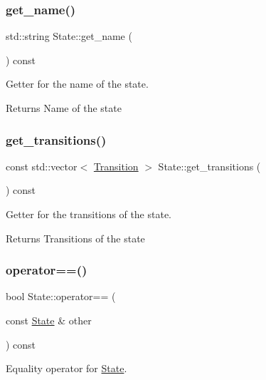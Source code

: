 \subsubsection{\texorpdfstring{get\+\_\+name()}{get\_name()}}
{\footnotesize\ttfamily std\+::string State\+::get\+\_\+name (\begin{DoxyParamCaption}{ }\end{DoxyParamCaption}) const}



Getter for the name of the state. 

\begin{DoxyReturn}{Returns}
Name of the state 
\end{DoxyReturn}
\mbox{\label{classState_a652bb5b393761ec2d42445f96446c4a6}} 
\subsubsection{\texorpdfstring{get\+\_\+transitions()}{get\_transitions()}}
{\footnotesize\ttfamily const std\+::vector$<$ \hyperlink{classTransition}{Transition} $>$ State\+::get\+\_\+transitions (\begin{DoxyParamCaption}{ }\end{DoxyParamCaption}) const}



Getter for the transitions of the state. 

\begin{DoxyReturn}{Returns}
Transitions of the state 
\end{DoxyReturn}
\mbox{\label{classState_ab98d310aaceb21737346521c5bc6fc6c}} 
\subsubsection{\texorpdfstring{operator==()}{operator==()}}
{\footnotesize\ttfamily bool State\+::operator== (\begin{DoxyParamCaption}\item[{const \hyperlink{classState}{State} \&}]{other }\end{DoxyParamCaption}) const}



Equality operator for \hyperlink{classState}{State}. 


